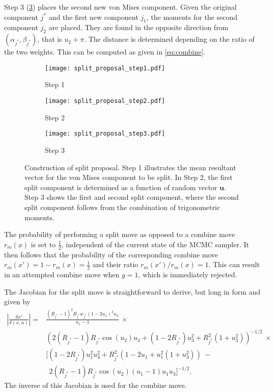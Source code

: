 Step 3 (\ref{fig:split-3}) places the second new von Mises component. Given the original component $j^*$ and the first new component $j_1$, the moments for the second component $j_2$ are placed. They are found in the opposite direction from $(\alpha_{j^*}, \beta_{j^*})$, that is $u_2 + \pi$. The distance is determined depending on the ratio of the two weights. This can be computed as given in \eqref{eq:combine}.

\begin{figure}
	\centering
	\begin{subfigure}[b]{0.3\textwidth}
		\texttt{[image: split\_proposal\_step1.pdf]}
		\caption{Step 1}
		\label{fig:split-1}
	\end{subfigure}
	\begin{subfigure}[b]{0.3\textwidth}
		\texttt{[image: split\_proposal\_step2.pdf]}
		\caption{Step 2}
		\label{fig:split-2}
	\end{subfigure}
	\begin{subfigure}[b]{0.3\textwidth}
		\texttt{[image: split\_proposal\_step3.pdf]}
		\caption{Step 3}
		\label{fig:split-3}
	\end{subfigure}
	\caption{Construction of split proposal. Step 1 illustrates the mean resultant vector for the von Mises component to be split. In Step 2, the first split component is determined as a function of random vector $\bm u$. Step 3 shows the first and second split component, where the second split component follows from the combination of trigonometric moments.}
	\label{fig:split-proposal}
\end{figure}

The probability of performing a split move as opposed to a combine move $r_m(x)$ is set to $\frac{1}{2}$, independent of the current state of the MCMC sampler. It then follows that the probability of the corresponding combine move $r_m(x') = 1-r_m(x) = \frac{1}{2}$ and their ratio $r_m(x') / r_m(x) = 1$. This can result in an attempted combine move when $g=1$, which is immediately rejected.

The Jacobian for the split move is straightforward to derive, but long in form and given by
\begin{align*}
\left| \frac{\delta x'}{\delta (x, u)} \right| =
&\frac{(R_{j^*}-1)^2 R_{j^*} w_{j^*} (1-2 u_1)^2 u_3}{u_1-1} ~\times \\
&\left(2 (R_{j^*}-1) R_{j^*} \cos(u_2) u_3 + (1 - 2 R_{j^*}) u_3^2 + R_{j^*}^2 (1 + u_3^2)\right)^{-1/2} ~\times\\
&\big[ (1 - 2 R_{j^*}) u_1^2 u_3^2 + R_{j^*}^2 (1-2 u_1 + u_1^2 (1+u_3^2)) ~ - \\ &~~ 2 (R_{j^*}-1) R_{j^*} \cos(u_2) (u_1-1) u_1 u_3\big]^{-1/2}.
\end{align*}
The inverse of this Jacobian is used for the combine move. 



